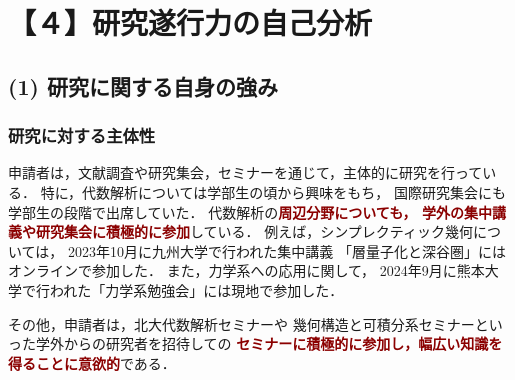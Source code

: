 \documentclass[10pt,a4paper,uplatex,dvipdfmx]{ujarticle} 		%
\newcommand{\研究課題名}{打切り超局所台の関手的性質の研究とMorse理論への応用}
\newcommand{\研究機関名}{北海道大学}
\newcommand{\研究代表者氏名}{大柴寿浩}
\begin{document}





\section{【４】研究遂行力の自己分析}

\subsection*{(1) 研究に関する自身の強み}
\subsubsection*{研究に対する主体性}
申請者は，文献調査や研究集会，セミナーを通じて，主体的に研究を行っている．
特に，代数解析については学部生の頃から興味をもち，
国際研究集会にも学部生の段階で出席していた．
代数解析の\textcolor{darkred}{\textbf{周辺分野についても，
学外の集中講義や研究集会に積極的に参加}}している．
例えば，シンプレクティック幾何については，
2023年10月に九州大学で行われた集中講義
「層量子化と深谷圏」にはオンラインで参加した．
また，力学系への応用に関して，
2024年9月に熊本大学で行われた「力学系勉強会」には現地で参加した．

その他，申請者は，北大代数解析セミナーや
幾何構造と可積分系セミナーといった学外からの研究者を招待しての
\textcolor{darkred}{\textbf{セミナーに積極的に参加し，幅広い知識を得ることに意欲的}}である．
\end{document}
